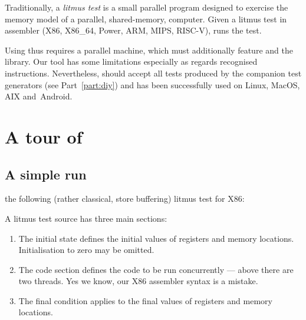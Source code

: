 Traditionally, a \emph{litmus test} is a small parallel program designed
to exercise the memory model of a parallel, shared-memory, computer.
Given a litmus test in assembler (X86, X86\_64, Power, ARM, MIPS, RISC-V), \litmus{}
runs the test.

Using \litmus{} thus requires a parallel machine,
which must additionally feature  and the  library.
Our tool \litmus{} has some limitations especially
as regards recognised instructions.
Nevertheless, \litmus{} should accept all tests
produced by the companion test generators (see Part~\ref{part:diy})
and has been successfully used on Linux, MacOS, AIX and~Android.


\section{A tour of~\litmus{}}

\subsection{A \label{litmus:simple} simple run}
 the following (rather classical, store buffering)
 litmus test for X86:

A litmus test source has three main sections:
\begin{enumerate}
\item The initial state defines the initial values of registers
and memory locations. Initialisation to zero may be omitted.
\item The code section defines the code to be run concurrently
--- above there are two threads.
Yes we know, our X86 assembler syntax is a mistake.
\item The final condition applies to the final values
of registers and memory locations.
\end{enumerate}

